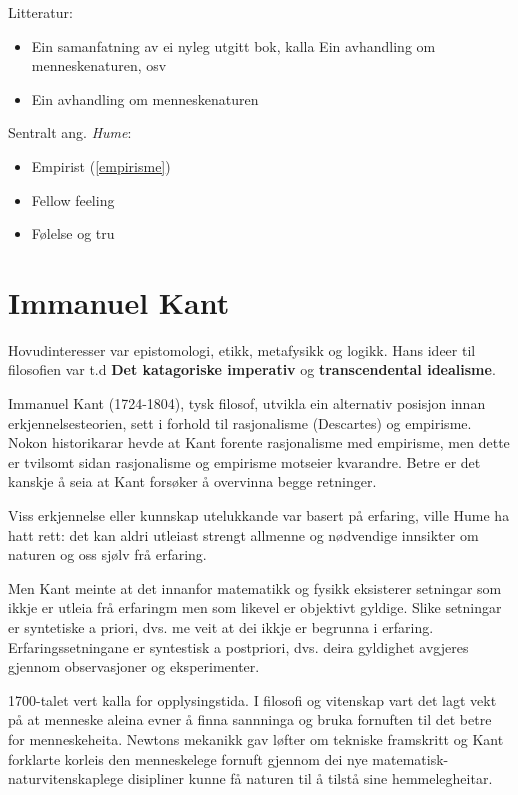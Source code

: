 \documentclass[a4paper]{IEEEtran}
\begin{document}
\begin{center}
Litteratur:
\end{center}
\begin{itemize}\bigskip
    \item Ein samanfatning av ei nyleg utgitt bok, kalla Ein avhandling om menneskenaturen, osv
    \item Ein avhandling om menneskenaturen
\end{itemize}\bigskip 

\begin{center}
Sentralt ang. \textit{Hume}:
\end{center}
\begin{itemize}\bigskip
    \item Empirist (\ref{empirisme})
    \item Fellow feeling
    \item Følelse og tru
\end{itemize}\bigskip


\section{Immanuel Kant}
\label{kant}\bigskip

Hovudinteresser var epistomologi, etikk, metafysikk og logikk. Hans ideer til filosofien var t.d \textbf{Det katagoriske imperativ} og \textbf{transcendental idealisme}.\bigskip

Immanuel Kant (1724-1804), tysk filosof, utvikla ein alternativ posisjon innan erkjennelsesteorien, sett i forhold til rasjonalisme (Descartes) og empirisme. Nokon historikarar hevde at Kant forente rasjonalisme med empirisme, men dette er tvilsomt sidan rasjonalisme og empirisme motseier kvarandre. Betre er det kanskje å seia at Kant forsøker å overvinna begge retninger.\bigskip

Viss erkjennelse eller kunnskap utelukkande var basert på erfaring, ville Hume ha hatt rett: det kan aldri utleiast strengt allmenne og nødvendige innsikter om naturen og oss sjølv frå erfaring.\bigskip

Men Kant meinte at det innanfor matematikk og fysikk eksisterer setningar som ikkje er utleia frå erfaringm men som likevel er objektivt gyldige. Slike setningar er syntetiske a priori, dvs. me veit at dei ikkje er begrunna i erfaring. Erfaringssetningane er syntestisk a postpriori, dvs. deira gyldighet avgjeres gjennom observasjoner og eksperimenter.\bigskip

1700-talet vert kalla for opplysingstida. I filosofi og vitenskap vart det lagt vekt på at menneske aleina evner å finna sannninga og bruka fornuften til det betre for menneskeheita. Newtons mekanikk gav løfter om tekniske framskritt og Kant forklarte korleis den menneskelege fornuft gjennom dei nye matematisk-naturvitenskaplege disipliner kunne få naturen til å tilstå sine hemmelegheitar.\bigskip
\end{document}
